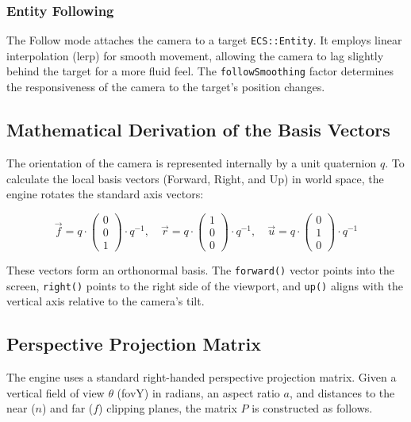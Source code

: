 \subsubsection{Entity Following}
The Follow mode attaches the camera to a target \texttt{ECS::Entity}. It employs linear interpolation (lerp) for smooth movement, allowing the camera to lag slightly behind the target for a more fluid feel. The \texttt{followSmoothing} factor determines the responsiveness of the camera to the target's position changes.

\subsection{Mathematical Derivation of the Basis Vectors}

The orientation of the camera is represented internally by a unit quaternion $q$. To calculate the local basis vectors (Forward, Right, and Up) in world space, the engine rotates the standard axis vectors:

\begin{equation}
    \vec{f} = q \cdot \begin{pmatrix} 0 \\ 0 \\ 1 \end{pmatrix} \cdot q^{-1}, \quad \vec{r} = q \cdot \begin{pmatrix} 1 \\ 0 \\ 0 \end{pmatrix} \cdot q^{-1}, \quad \vec{u} = q \cdot \begin{pmatrix} 0 \\ 1 \\ 0 \end{pmatrix} \cdot q^{-1}
\end{equation}

These vectors form an orthonormal basis. The \texttt{forward()} vector points into the screen, \texttt{right()} points to the right side of the viewport, and \texttt{up()} aligns with the vertical axis relative to the camera's tilt.

\subsection{Perspective Projection Matrix}

The engine uses a standard right-handed perspective projection matrix. Given a vertical field of view $\theta$ (fovY) in radians, an aspect ratio $a$, and distances to the near ($n$) and far ($f$) clipping planes, the matrix $P$ is constructed as follows.

